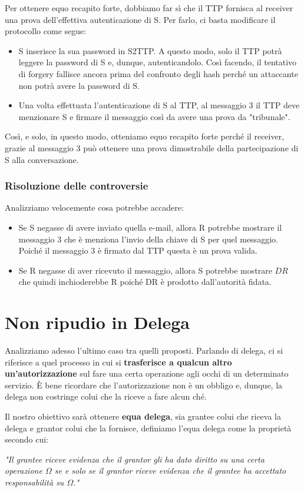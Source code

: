 Per ottenere equo recapito forte, dobbiamo far sì che il TTP fornisca al receiver una prova dell'effettiva autenticazione di S. Per farlo, ci basta modificare il protocollo come segue:
\begin{itemize}
    \item S inserisce la sua password in S2TTP. A questo modo, solo il TTP potrà leggere la password di S e, dunque, autenticandolo. Così facendo, il tentativo di forgery fallisce ancora prima del confronto degli hash perché un attaccante non potrà avere la password di S.
    \item Una volta effettuata l'autenticazione di S al TTP, al messaggio 3 il TTP deve menzionare S e firmare il messaggio così da avere una prova da "tribunale".
\end{itemize}
Così, e solo, in questo modo, otteniamo equo recapito forte perché il receiver, grazie al messaggio 3 può ottenere una prova dimostrabile della partecipazione di S alla conversazione.
\subsubsection{Risoluzione delle controversie}
Analizziamo velocemente cosa potrebbe accadere:
\begin{itemize}
    \item Se S negasse di avere inviato quella e-mail, allora R potrebbe mostrare il messaggio 3 che è menziona l'invio della chiave di S per quel messaggio. Poiché il messaggio 3 è firmato dal TTP questa è un prova valida.
    \item Se R negasse di aver ricevuto il messaggio, allora S potrebbe mostrare $DR$ che quindi inchioderebbe R poiché DR è prodotto dall'autorità fidata.
\end{itemize}
\section{Non ripudio in Delega}
Analizziamo adesso l'ultimo caso tra quelli proposti. Parlando di delega, ci si riferisce a quel processo in cui si \textbf{trasferisce a qualcun altro un'autorizzazione} sul fare una certa operazione agli occhi di un determinato servizio. È bene ricordare che l'autorizzazione non è un obbligo e, dunque, la delega non costringe colui che la riceve a fare alcun ché. 

Il nostro obiettivo sarà ottenere \textbf{equa delega}, sia grantee colui che riceva la delega e grantor colui che la fornisce, definiamo l'equa delega come la proprietà secondo cui:\\
\noindent\begin{minipage}{\textwidth}
\textit{"Il grantee riceve evidenza che il grantor gli ha dato diritto su una certa operazione $\Omega$ se e solo se il grantor riceve evidenza che il grantee ha accettato responsabilità su $\Omega$."}
\end{minipage}
